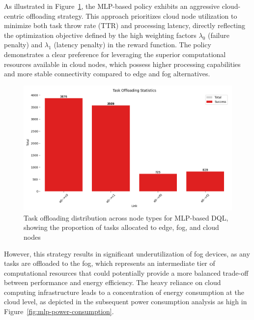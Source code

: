 \documentclass[preprint,3p,authoryear]{elsarticle}
\begin{document}

As illustrated in Figure~\ref{fig:mlp-task-offloading-stats}, the MLP-based policy exhibits an aggressive cloud-centric offloading strategy. This approach prioritizes cloud node utilization to minimize both task throw rate (TTR) and processing latency, directly reflecting the optimization objective defined by the high weighting factors $\lambda_0$ (failure penalty) and $\lambda_1$ (latency penalty) in the reward function. The policy demonstrates a clear preference for leveraging the superior computational resources available in cloud nodes, which possess higher processing capabilities and more stable connectivity compared to edge and fog alternatives.

\begin{figure}[H]
    \centering
    \includegraphics[width=0.5\linewidth]{figs/MLP/task_offloading_statistics.png}
    \caption{Task offloading distribution across node types for MLP-based DQL, showing the proportion of tasks allocated to edge, fog, and cloud nodes}
    \label{fig:mlp-task-offloading-stats}
\end{figure}

However, this strategy results in significant underutilization of fog devices, as any tasks are offloaded to the fog, which represents an intermediate tier of computational resources that could potentially provide a more balanced trade-off between performance and energy efficiency. The heavy reliance on cloud computing infrastructure leads to a concentration of energy consumption at the cloud level, as depicted in the subsequent power consumption analysis as high in Figure~\ref{fig:mlp-power-consumption}.
\end{document}
